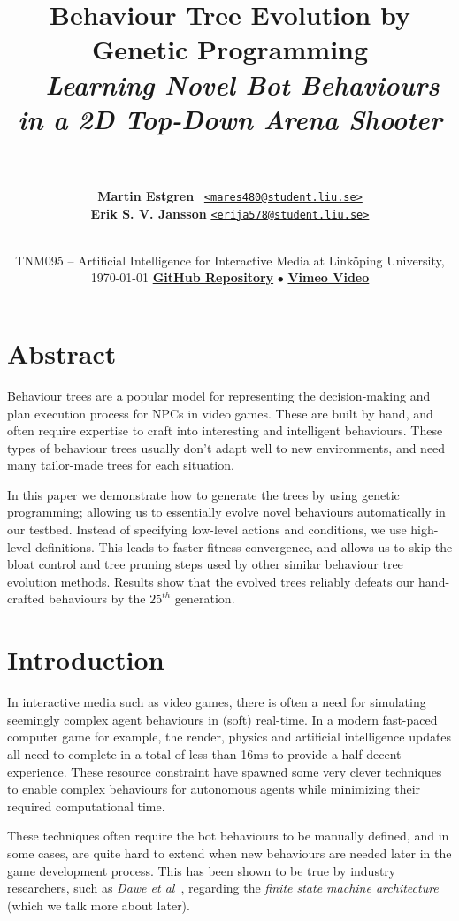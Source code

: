\documentclass[a4paper, twocolumn]{article}
\title{\textbf{Behaviour Tree Evolution by Genetic Programming}\\
       \Large{\emph{-- Learning Novel Bot Behaviours in a 2D Top-Down Arena Shooter --}}}
\date{
TNM095 -- Artificial Intelligence for Interactive Media\endgraf
at Linköping University, \today\endgraf\bigskip
\href{https://github.com/sci10n/Quake2D}{\textbf{GitHub Repository}}
$\bullet$
\href{https://vimeo.com/242262802}{\textbf{Vimeo Video}}
}
\author{{\textbf{Martin Estgren}} \;\;\;\;\;\;\;\;\;\, {\href{mailto:mares480@student.liu.se}
                                                       {\texttt{<mares480@student.liu.se>}}} \\
        {\textbf{Erik S. V. Jansson}} \;\;\;\;         {\href{mailto:erija578@student.liu.se}
                                                       {\texttt{<erija578@student.liu.se>}}} \\~\\
        \vspace{-5.0ex}}
\begin{document}
    \maketitle
    

    \section*{Abstract}

    Behaviour trees are a popular model for representing the decision-making and plan execution process for NPCs in video games. These are built by hand, and often require expertise to craft into interesting and intelligent behaviours. These types of behaviour trees usually don't adapt well to new environments, and need many tailor-made trees for each situation.

    In this paper we demonstrate how to generate the trees by using genetic programming; allowing us to essentially evolve novel behaviours automatically in our testbed. Instead of specifying low-level actions and conditions, we use high-level definitions. This leads to faster fitness convergence, and allows us to skip the bloat control and tree pruning steps used by other similar behaviour tree evolution methods. Results show that the evolved trees reliably defeats our hand-crafted behaviours by the \(25^{th}\) generation.

    \vspace{1em}

    \begingroup
    \def\addvspace#1{}
    \tableofcontents
    \endgroup

    \section{Introduction} \label{sec:introduction}

    In interactive media such as video games, there is often a need for simulating seemingly complex agent behaviours in (soft) real-time. In a modern fast-paced computer game for example, the render, physics and artificial intelligence updates all need to complete in a total of less than 16ms to provide a half-decent experience. These resource constraint have spawned some very clever techniques to enable complex behaviours for autonomous agents while minimizing their required computational time.

    These techniques often require the bot behaviours to be manually defined, and in some cases, are quite hard to extend when new behaviours are needed later in the game development process. This has been shown to be true by industry researchers, such as \emph{Dawe et al}~\cite{dawe2014overview}, regarding the \emph{finite state machine architecture} (which we talk more about later).
\end{document}
